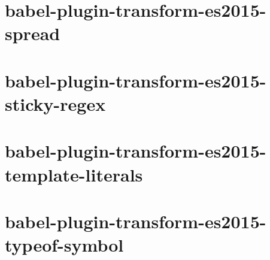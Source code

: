 \documentclass[twoside]{book}
\newcommand{\+}{\discretionary{\mbox{\scriptsize$\hookleftarrow$}}{}{}}
\begin{document}
\chapter{babel-\/plugin-\/transform-\/es2015-\/spread}
\label{md__c_1_workspace_demo_src_main_script_node_modules_babel-plugin-transform-es2015-spread__r_e_a_d_m_e}

\chapter{babel-\/plugin-\/transform-\/es2015-\/sticky-\/regex}
\label{md__c_1_workspace_demo_src_main_script_node_modules_babel-plugin-transform-es2015-sticky-regex__r_e_a_d_m_e}

\chapter{babel-\/plugin-\/transform-\/es2015-\/template-\/literals}
\label{md__c_1_workspace_demo_src_main_script_node_modules_babel-plugin-transform-es2015-template-literals__r_e_a_d_m_e}

\chapter{babel-\/plugin-\/transform-\/es2015-\/typeof-\/symbol}
\label{md__c_1_workspace_demo_src_main_script_node_modules_babel-plugin-transform-es2015-typeof-symbol__r_e_a_d_m_e}

\end{document}
